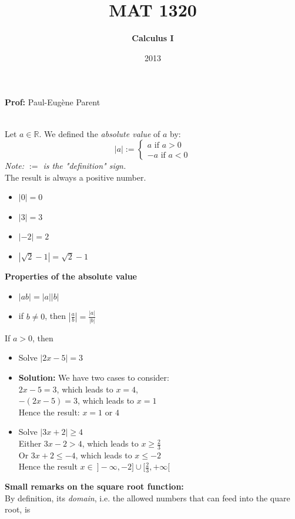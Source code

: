 \documentclass[]{article}
\begin{document}
	\title{MAT 1320}
	\author{{\bf Calculus I}}
	\date{2013}
	\maketitle
	\begin{center}
		{\bf Prof:} Paul-Eug\`{e}ne Parent
	\end{center}
	\pagebreak
	\normalsize 
	\\

	\noindent Let $a\in\mathbb{R}$. We defined the \emph{absolute value} of $a$ by:
	$$
		 |a|:=\begin{cases}
			a\text{ if } a>0\\
			-a\text{ if }a<0
		\end{cases}
	$$
	\emph{Note: $:=$ is the "definition" sign.}\\
	The result is always a positive number.
	\begin{itemize}
		\item $|0|=0$
		\item $|3|=3$
		\item $|-2|=2$
		\item $|\sqrt{2}-1|=\sqrt{2}-1$
	\end{itemize}
	{\bf Properties of the absolute value}
	\begin{itemize}
		\item $|ab|=|a||b|$
		\item if $b\ne 0$, then $|\frac{a}{b}|=\frac{|a|}{|b|}$
	\end{itemize}
	If $a>0$, then
	\begin{itemize}
		\item Solve $|2x-5|=3$
		\item {\bf Solution:} We have two cases to consider:\\
		$2x-5=3$, which leads to $x=4$,\\
		$-(2x-5)=3$, which leads to $x=1$\\
		Hence the result: $x=1$ or $4$
		\item Solve $|3x+2|\ge 4$\\
		Either $3x-2>4$, which leads to $x\ge\frac{2}{3}$\\
		Or $3x+2\le -4$, which leads to $x\le -2$\\
		Hence the result $x\in ~]-\infty,-2]\cup[\frac{2}{3},+\infty [$
	\end{itemize}
	{\bf Small remarks on the square root function:}\\
	By definition, its \emph{domain}, i.e. the allowed numbers that can feed into the quare root, is
\end{document}
